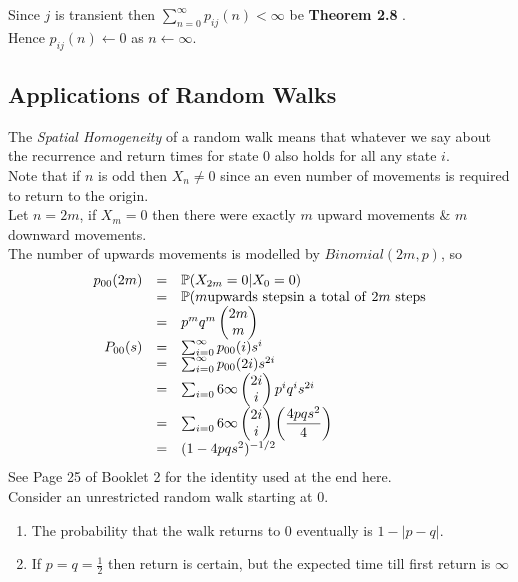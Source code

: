 \documentclass[11pt,a4paper]{article}
\begin{document}
\proof{}
Since $j$ is transient then $\sum_{n=0}^\infty p_{ij}(n)<\infty$ be \textbf{Theorem 2.8} .\\
Hence $p_{ij}(n)\leftarrow0$ as $n\leftarrow\infty$.

\subsection{Applications of Random Walks}

The \textit{Spatial Homogeneity} of a random walk means that whatever we say about the recurrence and return times for state $0$ also holds for all any state $i$.\\


Note that if $n$ is odd then $X_n\neq0$ since an even number of movements is required to return to the origin.\\
Let $n=2m$, if $X_m=0$ then there were exactly $m$ upward movements \& $m$ downward movements.\\
The number of upwards movements is modelled by $Binomial(2m,p)$, so
\[\begin{array}{rcl}
p_{00}(2m)&=&\mathbb{P}(X_{2m}=0|X_0=0)\\
&=&\mathbb{P}(m \mathrm{upwards\ steps in\ a\ total\ of\ } 2m\mathrm{\ steps}\\
&=&p^mq^m\begin{pmatrix}2m\\m\end{pmatrix}\\
P_{00}(s)&=&\sum_{i=0}^\infty p_{00}(i)s^i\\
&=&\sum_{i=0}^\infty p_{00}(2i)s^{2i}\\
&=&\sum_{i=0}6\infty\begin{pmatrix}2i\\i\end{pmatrix}p^iq^is^{2i}\\
&=&\sum_{i=0}6\infty\begin{pmatrix}2i\\i\end{pmatrix}\left(\dfrac{4pqs^2}{4}\right)\\
&=&(1-4pqs^2)^{-1/2}
\end{array}\]
\nb See Page 25 of Booklet 2 for the identity used at the end here.\\

\theorem{}
Consider an unrestricted random walk starting at $0$.
\begin{enumerate}[label=\roman*)]
	\item The probability that the walk returns to 0 eventually is $1-|p-q|$.
	\item If $p=q=\frac{1}{2}$ then return is certain, but the expected time till first return is $\infty$
\end{enumerate}
\end{document}
